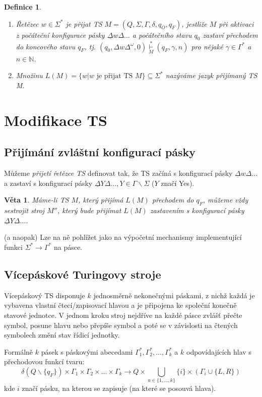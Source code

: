 \documentclass[a4paper, 11pt]{report}
\newtheorem{mydef}{Definice}[chapter]
\newtheorem{veta}{Věta}[chapter]
\begin{document}
\begin{mydef}
\begin{enumerate}
	\item Řetězec $w \in \Sigma^*$ je přijat TS $M = (Q, \Sigma, \Gamma, \delta, q_O, q_F)$, jestliže $M$ při aktivaci z \emph{počáteční konfigurace pásky} $\underline{\Delta} w \Delta \dots$ a počátečního stavu $q_0$ zastaví přechodem do koncového stavu $q_F$, tj. $(q_0, \Delta w \Delta^\omega, 0) \overset{*}{\underset{M}{\vdash}} (q_F, \gamma, n)$ pro nějaké $\gamma \in \Gamma^*$ a $n \in \mathbb{N}$.
	\item Množinu $L(M) = \{ w | w \text{ je přijat TS } M\} \subseteq \Sigma^*$ nazýváme jazyk přijímaný TS M.
\end{enumerate}
\end{mydef}

\section{Modifikace TS}
\subsection{Přijímání zvláštní konfigurací pásky}
Můžeme \emph{přijetí řetězce TS} definovat tak, že TS začíná s konfigurací pásky $\underline{\Delta} w \Delta \dots$ a zastaví s konfigurací pásky $\underline{\Delta} Y \Delta \dots, Y \in \Gamma \backslash \Sigma$ ($Y$ značí Yes).

\begin{veta}
Máme-li TS $M$, který přijímá $L(M)$ přechodem do $q_F$, můžeme vždy sestrojit stroj $M''$, který bude přijímat $L(M)$ zastavením s konfigurací pásky $\underline{\Delta} Y \Delta \dots$.
\end{veta}
(a naopak) Lze na ně pohlížet jako na výpočetní mechanismy implementující funkci $\Sigma^* \to \Gamma^*$ na pásce.

\subsection{Vícepáskové Turingovy stroje}
Vícepáskový TS disponuje $k$ jednosměrně nekonečnými páskami, z nichž každá je vybavena vlastní čtecí/zapisovací hlavou a je připojena ke společní konečně stavové jednotce. V jednom kroku stroj nejdříve na každé pásce zvlášť přečte symbol, posune hlavu nebo přepíše symbol a poté se v závislosti na čtených symbolech změní stav řídicí jednotky.

Formálně $k$ pásek s páskovými abecedami $\Gamma^*_1, \Gamma^*_2, \dots, \Gamma^*_k$ a $k$ odpovídajících hlav s přechodovou funkcí tvaru:
$$\delta(Q \backslash \{q_F\}) \times \Gamma_1 \times \Gamma_2 \times \dots \times \Gamma_k \to Q \times \bigcup\limits_{u \in \{1, \dots, k\}} \{i\} \times (\Gamma_i \cup \{L, R\})$$
kde $i$ značí pásku, na kterou se zapisuje (na které se posouvá hlava).
\end{document}

